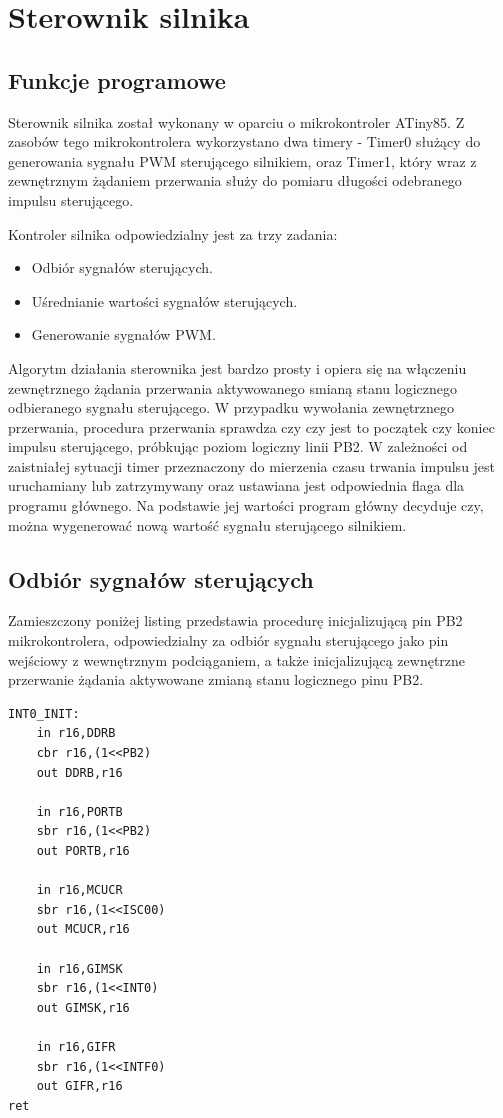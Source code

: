 \section{Sterownik silnika}
\subsection{Funkcje programowe}
Sterownik silnika został wykonany w oparciu o mikrokontroler ATiny85. Z zasobów tego mikrokontrolera wykorzystano dwa timery - Timer0 służący do generowania sygnału PWM sterującego silnikiem, oraz Timer1, który wraz z zewnętrznym żądaniem przerwania służy do pomiaru długości odebranego impulsu sterującego.

Kontroler silnika odpowiedzialny jest za trzy zadania:
\begin{itemize}
	\item Odbiór sygnałów sterujących.
	\item Uśrednianie wartości sygnałów sterujących.
	\item Generowanie sygnałów PWM.
\end{itemize}

Algorytm działania sterownika jest bardzo prosty i opiera się na włączeniu zewnętrznego żądania przerwania aktywowanego smianą stanu logicznego odbieranego sygnału sterującego. W przypadku wywołania zewnętrznego przerwania, procedura przerwania sprawdza czy czy jest to początek czy koniec impulsu sterującego, próbkując poziom logiczny linii PB2. W zależności od zaistniałej sytuacji timer przeznaczony do mierzenia czasu trwania impulsu jest uruchamiany lub zatrzymywany oraz ustawiana jest odpowiednia flaga dla programu głównego. Na podstawie jej wartości program główny decyduje czy, można wygenerować nową wartość sygnału sterującego silnikiem.


\subsection{Odbiór sygnałów sterujących}

Zamieszczony poniżej listing przedstawia procedurę inicjalizującą pin PB2 mikrokontrolera, odpowiedzialny za odbiór sygnału sterującego jako pin wejściowy z wewnętrznym podciąganiem, a także inicjalizującą zewnętrzne przerwanie żądania aktywowane zmianą stanu logicznego pinu PB2. 

\begin{lstlisting}
INT0_INIT:
	in r16,DDRB
	cbr r16,(1<<PB2)
	out DDRB,r16	

	in r16,PORTB
	sbr r16,(1<<PB2)
	out PORTB,r16

	in r16,MCUCR
	sbr r16,(1<<ISC00)
	out MCUCR,r16

	in r16,GIMSK
	sbr r16,(1<<INT0)
	out GIMSK,r16

	in r16,GIFR
	sbr r16,(1<<INTF0)
	out GIFR,r16
ret
\end{lstlisting}


